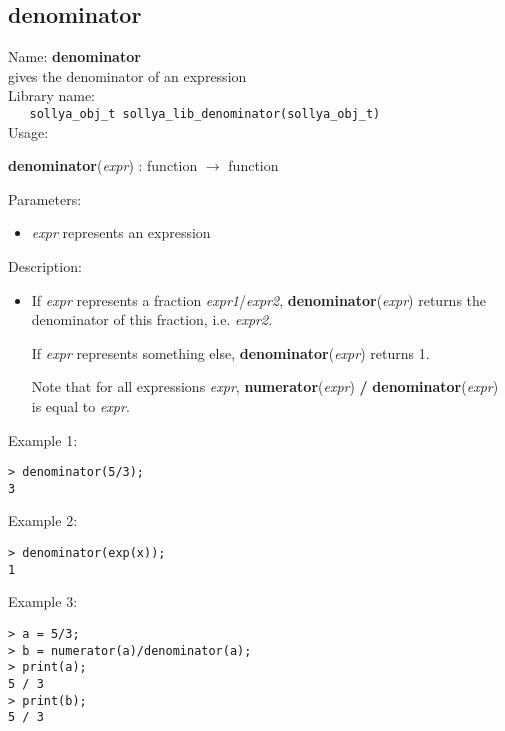 \subsection{denominator}
\label{labdenominator}
\noindent Name: \textbf{denominator}\\
\phantom{aaa}gives the denominator of an expression\\[0.2cm]
\noindent Library name:\\
\verb|   sollya_obj_t sollya_lib_denominator(sollya_obj_t)|\\[0.2cm]
\noindent Usage: 
\begin{center}
\textbf{denominator}(\emph{expr}) : \textsf{function} $\rightarrow$ \textsf{function}\\
\end{center}
Parameters: 
\begin{itemize}
\item \emph{expr} represents an expression
\end{itemize}
\noindent Description: \begin{itemize}

\item If \emph{expr} represents a fraction \emph{expr1}/\emph{expr2}, \textbf{denominator}(\emph{expr})
   returns the denominator of this fraction, i.e. \emph{expr2}.
    
   If \emph{expr} represents something else, \textbf{denominator}(\emph{expr}) 
   returns 1.
    
   Note that for all expressions \emph{expr}, \textbf{numerator}(\emph{expr}) \textbf{/} \textbf{denominator}(\emph{expr})
   is equal to \emph{expr}.
\end{itemize}
\noindent Example 1: 
\begin{center}\begin{minipage}{15cm}\begin{Verbatim}[frame=single]
> denominator(5/3);
3
\end{Verbatim}
\end{minipage}\end{center}
\noindent Example 2: 
\begin{center}\begin{minipage}{15cm}\begin{Verbatim}[frame=single]
> denominator(exp(x));
1
\end{Verbatim}
\end{minipage}\end{center}
\noindent Example 3: 
\begin{center}\begin{minipage}{15cm}\begin{Verbatim}[frame=single]
> a = 5/3;
> b = numerator(a)/denominator(a);
> print(a);
5 / 3
> print(b);
5 / 3
\end{Verbatim}
\end{minipage}\end{center}
